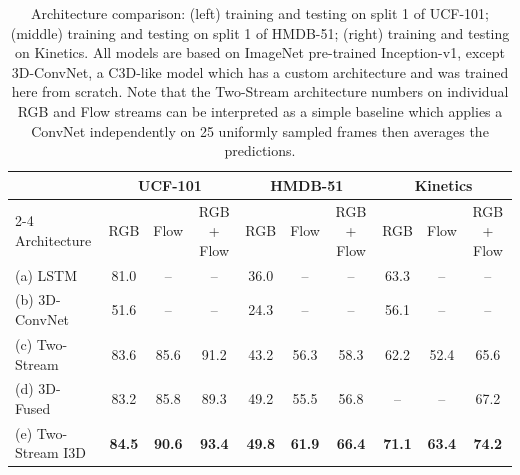 \documentclass[10pt,twocolumn,letterpaper]{article}
\begin{document}
\begin{table}[h]
\begin{center}
    \begin{tabular}{| l | c | c | c || c | c | c || c | c | c |}
    \hline
 &  \multicolumn{3}{|c||}{UCF-101} &  \multicolumn{3}{c||}{HMDB-51}  &  \multicolumn{3}{|c|}{Kinetics} \\ \cline{2-4} \cline{5-7} \cline{8-10}
Architecture            & RGB   & Flow  & RGB + Flow &  RGB   & Flow  & RGB + Flow & RGB   & Flow  & RGB + Flow    \\ \hline \hline
    (a) LSTM           & 81.0 & -- & -- & 36.0 & --  & -- & 63.3  & -- & --      \\ \hline
    (b) 3D-ConvNet           & 51.6 & -- & -- & 24.3 & --  & -- & 56.1 & -- & --         \\ \hline
    (c) Two-Stream          & 83.6  & 85.6  & 91.2  & 43.2  & 56.3  & 58.3 & 62.2 & 52.4 &   65.6 \\ \hline
    (d) 3D-Fused            &  83.2 & 85.8 & 89.3 & 49.2 & 55.5 & 56.8 & -- & -- & 67.2 \\ \hline \hline
    (e) Two-Stream I3D     & \textbf{84.5} & \textbf{90.6}  & \textbf{93.4} & \textbf{49.8} & \textbf{61.9} & \textbf{66.4} & \textbf{71.1} & \textbf{63.4} & \textbf{74.2}        \\ \hline
    \hline
    \end{tabular}
\end{center}
\caption{Architecture comparison: (left) training and testing on split 1 of UCF-101; (middle) training and testing on split 1 of HMDB-51; (right) training and testing on Kinetics. All models are based on ImageNet pre-trained Inception-v1, except 3D-ConvNet, a C3D-like \cite{tran2015learning} model which has a custom architecture and was  trained here from scratch. Note that
the Two-Stream architecture numbers on individual RGB and Flow streams
can be interpreted as a simple baseline which applies a ConvNet
independently on 25 uniformly sampled frames then averages the
predictions.}
\label{fig:archCompPerf}
\end{table}
\end{document}
